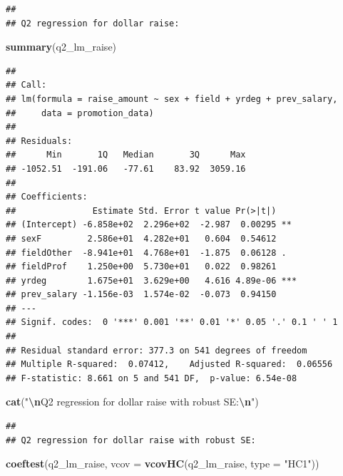 \documentclass[
]{article}
\newenvironment{Shaded}{\begin{snugshade}}{\end{snugshade}}
\newcommand{\AttributeTok}[1]{\textcolor[rgb]{0.13,0.29,0.53}{#1}}
\newcommand{\FunctionTok}[1]{\textcolor[rgb]{0.13,0.29,0.53}{\textbf{#1}}}
\newcommand{\NormalTok}[1]{#1}
\newcommand{\SpecialCharTok}[1]{\textcolor[rgb]{0.81,0.36,0.00}{\textbf{#1}}}
\newcommand{\StringTok}[1]{\textcolor[rgb]{0.31,0.60,0.02}{#1}}
\begin{document}
\begin{verbatim}
## 
## Q2 regression for dollar raise:
\end{verbatim}

\begin{Shaded}
\begin{Highlighting}[]
\FunctionTok{summary}\NormalTok{(q2\_lm\_raise)}
\end{Highlighting}
\end{Shaded}

\begin{verbatim}
## 
## Call:
## lm(formula = raise_amount ~ sex + field + yrdeg + prev_salary, 
##     data = promotion_data)
## 
## Residuals:
##      Min       1Q   Median       3Q      Max 
## -1052.51  -191.06   -77.61    83.92  3059.16 
## 
## Coefficients:
##               Estimate Std. Error t value Pr(>|t|)    
## (Intercept) -6.858e+02  2.296e+02  -2.987  0.00295 ** 
## sexF         2.586e+01  4.282e+01   0.604  0.54612    
## fieldOther  -8.941e+01  4.768e+01  -1.875  0.06128 .  
## fieldProf    1.250e+00  5.730e+01   0.022  0.98261    
## yrdeg        1.675e+01  3.629e+00   4.616 4.89e-06 ***
## prev_salary -1.156e-03  1.574e-02  -0.073  0.94150    
## ---
## Signif. codes:  0 '***' 0.001 '**' 0.01 '*' 0.05 '.' 0.1 ' ' 1
## 
## Residual standard error: 377.3 on 541 degrees of freedom
## Multiple R-squared:  0.07412,    Adjusted R-squared:  0.06556 
## F-statistic: 8.661 on 5 and 541 DF,  p-value: 6.54e-08
\end{verbatim}

\begin{Shaded}
\begin{Highlighting}[]
\FunctionTok{cat}\NormalTok{(}\StringTok{"}\SpecialCharTok{\textbackslash{}n}\StringTok{Q2 regression for dollar raise with robust SE:}\SpecialCharTok{\textbackslash{}n}\StringTok{"}\NormalTok{)}
\end{Highlighting}
\end{Shaded}

\begin{verbatim}
## 
## Q2 regression for dollar raise with robust SE:
\end{verbatim}

\begin{Shaded}
\begin{Highlighting}[]
\FunctionTok{coeftest}\NormalTok{(q2\_lm\_raise, }\AttributeTok{vcov =} \FunctionTok{vcovHC}\NormalTok{(q2\_lm\_raise, }\AttributeTok{type =} \StringTok{"HC1"}\NormalTok{))}
\end{Highlighting}
\end{Shaded}
\end{document}
